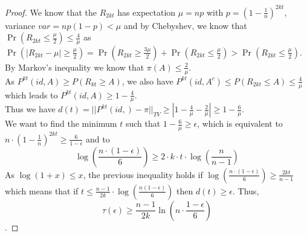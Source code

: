 \documentclass[USenglish,oneside,twocolumn]{article}
\begin{document}
\begin{proof}
We know that the $R_{2kt}$ has expectation $\mu = np$  with $p=\left ( 1 - \frac{1}{n} \right )^{2kt}$, variance $var = np(1-p) <\mu$ and by Chebyshev, we know that $\Pr(R_{2kt}\leq \frac{\mu}{2})\leq \frac{4}{\mu}$
as $\Pr(|R_{2kt} - \mu|\geq \frac{\mu}{2}) = \Pr(R_{2kt} \geq \frac{3\mu}{2}) + \Pr(R_{2kt} \leq \frac{\mu}{2}) > \Pr(R_{2kt} \leq \frac{\mu}{2})$.\\

By Markov's inequality we know that $\pi(A) \leq \frac{2}{\mu}$.\\

As $P^{kt}(id,A) \geq P(R_{kt}\geq A) $, we also have $P^{kt}(id,A^c) \leq P(R_{2kt}\leq A) \leq \frac{4}{\mu} $ which leads to $P^{kt}(id,A)\geq1 - \frac{4}{\mu}$.\\

Thus we have $d(t)=||P^{kt}(id,) - \pi ||_{TV} \geq |1 - \frac{4}{\mu} - \frac{2}{\mu}| \geq 1 - \frac{6}{\mu}$.\\

We want to find the minimum $t$ such that $1-\frac{6}{\mu}\geq \epsilon$, which is equivalent to $n \cdot \left ( 1 - \frac{1}{n} \right )^{2kt} \geq \frac{6}{1-\epsilon}$ and to
$$\log\left(\frac{n\cdot (1-\epsilon)}{6}\right) \geq 2\cdot k\cdot t \cdot \log \left ( \frac{n}{n-1} \right )$$
As $\log(1+x) \leq x$, the previous inequality holds if $\log\left(\frac{n\cdot (1-\epsilon)}{6}\right) \geq   \frac{2kt}{n-1} $ which means that if $t\leq \frac{n-1}{2k}\cdot \log\left ( \frac{n(1-\epsilon)}{6}\right )$ then $d(t)\geq \epsilon$.
Thus,
$$\tau \left (\epsilon \right ) \geq \frac{n-1}{2k} \ln(n\cdot \frac{1-\epsilon}{6}) $$.
\end{proof}
\end{document}
